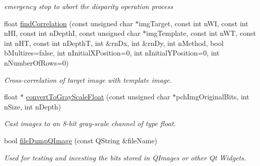 \begin{DoxyCompactItemize}
\begin{DoxyCompactList}\small\item\em emergency stop to abort the disparity operation process \item\end{DoxyCompactList}\item 
float \hyperlink{classQcorr_a05dcc1b0be4596b355df235264180da4}{findCorrelation} (const unsigned char $\ast$imgTarget, const int nWI, const int nHI, const int nDepthI, const unsigned char $\ast$imgTemplate, const int nWT, const int nHT, const int nDepthT, int \&rnDx, int \&rnDy, int nMethod, bool bMultires=false, int nInitialXPosition=0, int nInitialYPosition=0, int nNumberOfRows=0)
\begin{DoxyCompactList}\small\item\em Cross-\/correlation of target image with template image. \item\end{DoxyCompactList}\item 
float $\ast$ \hyperlink{classQcorr_a0f203c8a83cd1e6b503aee0a4c873402}{convertToGrayScaleFloat} (const unsigned char $\ast$pchImgOriginalBits, int nSize, int nDepth)
\begin{DoxyCompactList}\small\item\em Cast images to an 8-\/bit gray-\/scale channel of type float. \item\end{DoxyCompactList}\item 
bool \hyperlink{classQcorr_a87229fc918fa4011e96fbadb325fd52e}{fileDumpQImage} (const QString \&fileName)
\begin{DoxyCompactList}\small\item\em Used for testing and investing the bits stored in QImages or other Qt Widgets. \item\end{DoxyCompactList}\end{DoxyCompactItemize}
